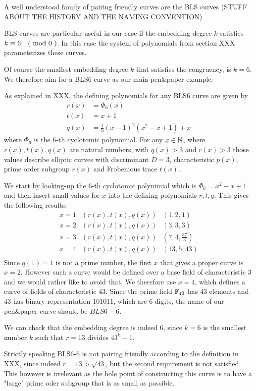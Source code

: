 A well understood family of pairing friendly curves are the BLS curves (STUFF ABOUT THE HISTORY AND THE NAMING CONVENTION)

BLS curves are particular useful in our case if the embedding degree $k$ satisfies $k \equiv 6 \quad \text{( mod } 0 \text{ )}$. In this case the system of polynomials from section XXX parameterizes these curves.

Of course the smallest embedding degree $k$ that satisfies the congruency, is $k=6$. We therefore aim for a BLS6 curve as our main pen\&{}paper example. 

As explained in XXX, the defining polynomials for any BLS6 curve are given by
\begin{align*}
r(x) &= \Phi_6(x)\\
t(x) &= x+1\\
q(x) &= \frac{1}{3}(x-1)^2(x^{2}-x+1) +x
\end{align*}
where $\Phi_6$ is the $6$-th cyclotomic polynomial. For any $x\in\mathbb{N}$, where $r(x),t(x),q(x)$ are natural numbers, with $q(x)>3$ and $r(x)>3$ those values describe elliptic curves with discriminant $D=3$, characteristic $p(x)$, prime order subgroup $r(x)$ and Frobenious trace $t(x)$.  

We start by looking-up the $6$-th cyclotomic polynimial which is $\Phi_{6}=x^2-x+1$ and then insert small values for $x$ into the defining polynomials $r,t,q$. This gives the following results:
$$
\begin{array}{lcr}
x=1 & (r(x),t(x),q(x)) & (1,2,1)\\
x=2 & (r(x),t(x),q(x)) & (3,3,3)\\
x=3 & (r(x),t(x),q(x)) & (7,4,\frac{37}{3})\\
x=4 & (r(x),t(x),q(x)) & (13,5,43)\\
\end{array}
$$
Since $q(1)=1$ is not a prime number, the first $x$ that gives a proper curve is $x=2$. However such a curve would be defined over a base field of characteristic $3$ and we would rather like to avoid that. We therefore use $x=4$, which defines a curve of fields of characteristic $43$. Since the prime field $\mathbb{F}_{43}$ has $43$ elements and $43$ has binary representation $101011$, which are $6$ digits, the name of our pen\&{}paper curve should be $BLS6-6$.

We can check that the embedding degree is indeed $6$, since $k= 6$ is the smallest number $k$ such that $r=13$ divides $43^k-1$. 

Strictly speaking BLS6-6 is not pairing friendly according to the definition in XXX, since indeed $r=13 > \sqrt{43}$, but the second requirement is not satisfied. This however is irrelevant as the hole point of constructing this curve is to have a "large" prime oder subgroup that is as small as possible. 

